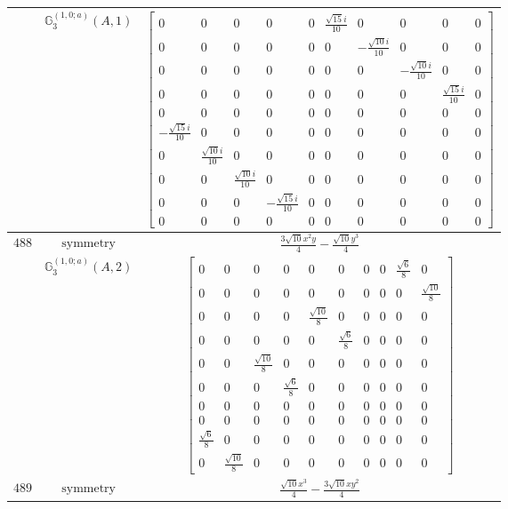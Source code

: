 \documentclass[fleqn,8pt,landscape]{jsarticle}
\begin{document}
\begin{longtable}{ccc}
$  $ & $ \mathbb{G}_{3}^{(1,0;a)}(A,1) $ & $ \begin{bmatrix} 0 & 0 & 0 & 0 & 0 & \frac{\sqrt{15} i}{10} & 0 & 0 & 0 & 0 \\ 0 & 0 & 0 & 0 & 0 & 0 & - \frac{\sqrt{10} i}{10} & 0 & 0 & 0 \\ 0 & 0 & 0 & 0 & 0 & 0 & 0 & - \frac{\sqrt{10} i}{10} & 0 & 0 \\ 0 & 0 & 0 & 0 & 0 & 0 & 0 & 0 & \frac{\sqrt{15} i}{10} & 0 \\ 0 & 0 & 0 & 0 & 0 & 0 & 0 & 0 & 0 & 0 \\ - \frac{\sqrt{15} i}{10} & 0 & 0 & 0 & 0 & 0 & 0 & 0 & 0 & 0 \\ 0 & \frac{\sqrt{10} i}{10} & 0 & 0 & 0 & 0 & 0 & 0 & 0 & 0 \\ 0 & 0 & \frac{\sqrt{10} i}{10} & 0 & 0 & 0 & 0 & 0 & 0 & 0 \\ 0 & 0 & 0 & - \frac{\sqrt{15} i}{10} & 0 & 0 & 0 & 0 & 0 & 0 \\ 0 & 0 & 0 & 0 & 0 & 0 & 0 & 0 & 0 & 0 \end{bmatrix} $ \\ \hline
$ 488 $ & $ \text{symmetry} $ & $ \frac{3 \sqrt{10} x^{2} y}{4} - \frac{\sqrt{10} y^{3}}{4} $ \\
$  $ & $ \mathbb{G}_{3}^{(1,0;a)}(A,2) $ & $ \begin{bmatrix} 0 & 0 & 0 & 0 & 0 & 0 & 0 & 0 & \frac{\sqrt{6}}{8} & 0 \\ 0 & 0 & 0 & 0 & 0 & 0 & 0 & 0 & 0 & \frac{\sqrt{10}}{8} \\ 0 & 0 & 0 & 0 & \frac{\sqrt{10}}{8} & 0 & 0 & 0 & 0 & 0 \\ 0 & 0 & 0 & 0 & 0 & \frac{\sqrt{6}}{8} & 0 & 0 & 0 & 0 \\ 0 & 0 & \frac{\sqrt{10}}{8} & 0 & 0 & 0 & 0 & 0 & 0 & 0 \\ 0 & 0 & 0 & \frac{\sqrt{6}}{8} & 0 & 0 & 0 & 0 & 0 & 0 \\ 0 & 0 & 0 & 0 & 0 & 0 & 0 & 0 & 0 & 0 \\ 0 & 0 & 0 & 0 & 0 & 0 & 0 & 0 & 0 & 0 \\ \frac{\sqrt{6}}{8} & 0 & 0 & 0 & 0 & 0 & 0 & 0 & 0 & 0 \\ 0 & \frac{\sqrt{10}}{8} & 0 & 0 & 0 & 0 & 0 & 0 & 0 & 0 \end{bmatrix} $ \\ \hline
$ 489 $ & $ \text{symmetry} $ & $ \frac{\sqrt{10} x^{3}}{4} - \frac{3 \sqrt{10} x y^{2}}{4} $ \\

\end{longtable}
\end{document}
